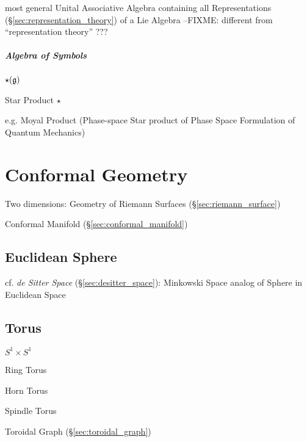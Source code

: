most general Unital Associative Algebra containing all Representations
(\S\ref{sec:representation_theory}) of a Lie Algebra
--FIXME: different from ``representation theory'' ???



\subparagraph{Algebra of Symbols}\label{sec:symbol_algebra}\hfill

$\star(\mathfrak{g})$

Star Product $\star$

e.g. Moyal Product (Phase-space Star product of Phase Space Formulation of
Quantum Mechanics)



\section{Conformal Geometry}\label{sec:conformal_geometry}

Two dimensions: Geometry of Riemann Surfaces
(\S\ref{sec:riemann_surface})

\fist Conformal Manifold (\S\ref{sec:conformal_manifold})



\subsection{Euclidean Sphere}\label{sec:euclidean_sphere}

cf. \emph{de Sitter Space} (\S\ref{sec:desitter_space}): Minkowski Space analog
of Sphere in Euclidean Space



\subsection{Torus}\label{sec:torus}

$S^1 \times S^1$

Ring Torus

Horn Torus

Spindle Torus

\fist Toroidal Graph (\S\ref{sec:toroidal_graph})



